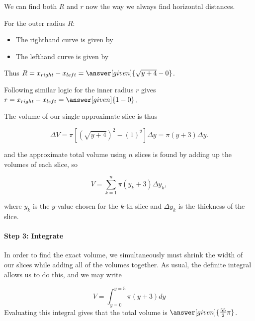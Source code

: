 \documentclass{ximera}
\begin{document}
\begin{model}
\begin{image}
            \end{image}
            
We can find both $R$ and $r$ now the way we always find horizontal distances.

For the outer radius $R$:

\begin{itemize}
\item The righthand curve is given by 
\item The lefthand curve is given by 
\end{itemize}

Thus $R = x_{right}-x_{left} = \answer[given]{\sqrt{y+4}-0}$.
            
Following similar logic for the inner radius $r$ gives $r = x_{right}-x_{left} = \answer[given]{1-0}$.   
   
The volume of our single approximate slice is thus

\[
\Delta V = \pi\left[\left(\sqrt{y+4}\right)^2-(1)^2\right]\Delta y = \pi(y+3)\Delta y.
\]   
   
and the approximate total volume using $n$ slices is found by adding up the volumes of each slice, so
   
\[
V = \sum_{k=1}^n \pi(y_k+3)\Delta y_k,
\]      

where $y_k$ is the $y$-value chosen for the $k$-th slice and $\Delta y_k$ is the thickness of the slice.
   
\paragraph{Step 3: Integrate}
In order to find the exact volume, we simultaneously must shrink the width of our slices while adding all of the volumes together.  As usual, the definite integral allows us to do this, and we may write

\[
V= \int_{y=0}^{y=5} \pi(y+3) dy 
\]    
Evaluating this integral gives that the total volume is $\answer[given]{\frac{55}{2}\pi}$.   
\end{model}
%
\end{document}
